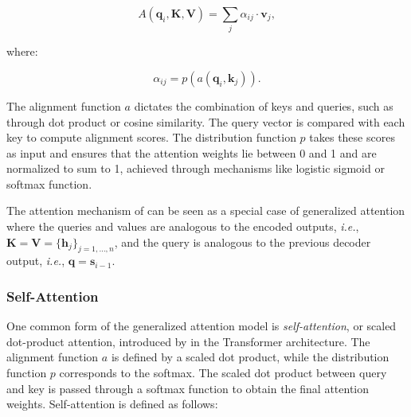 

\begin{equation}
    A(\bm{q}_i, \bm{K}, \bm{V}) = \sum_j \alpha_{ij} \cdot \bm{v}_j,
\end{equation}

\noindent where:

\begin{equation}
    \alpha_{ij} = p(a(\bm{q}_i, \bm{k}_j)).
\end{equation}

\noindent The alignment function $a$ dictates the combination of keys and queries, such as through dot product or cosine similarity. The query vector is compared with each key to compute alignment scores. The distribution function $p$ takes these scores as input and ensures that the attention weights lie between 0 and 1 and are normalized to sum to 1, achieved through mechanisms like logistic sigmoid or softmax function.

The attention mechanism of \citet{bahdanau2014neural} can be seen as a special case of generalized attention where the queries and values are analogous to the encoded outputs, \textit{i.e.}, $\bm{K} = \bm{V} = \{\bm{h}_j\}_{j=1, \ldots, n}$, and the query is analogous to the previous decoder output, \textit{i.e.}, $\bm{q} = \bm{s}_{i-1}$. 


\subsubsection{Self-Attention} 

One common form of the generalized attention model is \textit{self-attention}, or scaled dot-product attention, introduced by \citet{vaswani2017attention} in the Transformer architecture. The alignment function $a$ is defined by a scaled dot product, while the distribution function $p$ corresponds to the softmax. The scaled dot product between query and key is passed through a softmax function to obtain the final attention weights. Self-attention is defined as follows:

